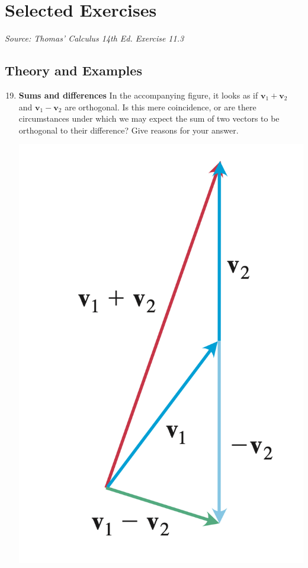 \newpage

\section*{Selected Exercises}
\textit{Source: Thomas' Calculus 14th Ed. Exercise 11.3}

\subsection*{Theory and Examples}

\begin{enumerate}
    \setcounter{enumi}{18}
    \item \textbf{Sums and differences} In the accompanying figure, it looks as if
          $\mathbf{v}_1+\mathbf{v}_2$ and $\mathbf{v}_1-\mathbf{v}_2$ are orthogonal. Is
          this mere coincidence, or are there circumstances under which we may expect the
          sum of two vectors to be orthogonal to their difference? Give reasons for your
          answer. \begin{center}
              \includegraphics[scale=0.3]{./assets/thomas12.3q19.png}
          \end{center}


\end{enumerate}
